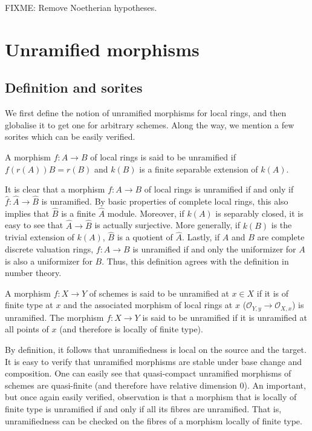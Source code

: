 \smallskip\noindent
FIXME: Remove Noetherian hypotheses.

\section{Unramified morphisms}
\label{section-unramified}

\subsection{Definition and sorites}
\label{subsection-unramified-definition}

\noindent
We first define the notion of unramified morphisms for local rings, and then
globalise it to get one for arbitrary schemes. Along the way, we mention a few
sorites which can be easily verified.

\begin{definition}
\label{definition-unramified-rings}
A morphism $f:A \to B$ of local rings is said to be unramified if
$f(r(A))B = r(B)$ and $k(B)$ is a finite separable extension of $k(A)$. 
\end{definition}

\noindent
It is clear that a morphism $f:A \to B$ of local rings is unramified if and
only if $\widehat{f}:\widehat{A} \to \widehat{B}$ is unramified. By basic
properties of complete local rings, this also implies that $\widehat{B}$ is a
finite $\widehat{A}$ module. Moreover, if $k(A)$ is separably closed, it is
easy to see that $\widehat{A} \to \widehat{B}$ is actually surjective. More
generally, if $k(B)$ is the trivial extension of $k(A)$, $\widehat{B}$ is a
quotient of $\widehat{A}$. Lastly, if $A$ and $B$ are complete discrete
valuation rings, $f:A \to B$ is unramified if and only the uniformizer for
$A$ is also a uniformizer for $B$. Thus, this definition agrees with the
definition in number theory.

\begin{definition}
\label{definition-unramified-schemes}
A morphism $f:X \to Y$ of schemes is said to be unramified at $x \in X$ if it
is of finite type at $x$ and the associated morphism of local rings at $x$
($\mathcal{O}_{Y,y} \to \mathcal{O}_{X,x}$) is unramified. The morphism $f:X \to Y$ is said to
be unramified if it is unramified at all points of $x$ (and therefore is
locally of finite type).
\end{definition}

\noindent
By definition, it follows that unramifiedness is local on the source and the
target. It is easy to verify that unramified morphisms are stable under
base change and composition. One can easily see that quasi-compact unramified
morphisms of schemes are quasi-finite (and therefore have relative dimension
$0$). An important, but once again easily verified, observation is that a
morphism that is locally of finite type is unramified if and only if all its
fibres are unramified. That is, unramifiedness can be checked on the fibres
of a morphism locally of finite type.

